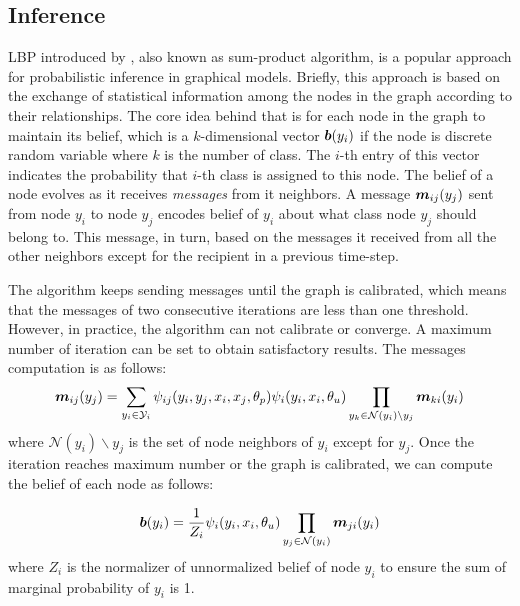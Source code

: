 \subsection{Inference}
\gls{LBP} introduced by \cite{pearl2014probabilistic}, also known as sum-product algorithm, is a popular approach for probabilistic inference in graphical models. Briefly, this approach is based on the exchange of statistical information among the nodes in the graph according to their relationships. The core idea behind that is for each node in the graph to maintain its belief, which is a $k$-dimensional vector $\boldsymbol b(y_i)$ if the node is discrete random variable where $k$ is the number of class. The $i$-th entry of this vector indicates the probability that $i$-th class is assigned to this node. The belief of a node evolves as it receives \textit{messages} from it neighbors. A message $\boldsymbol m_{ij}(y_j)$ sent from node $y_i$ to node $y_j$ encodes belief of $y_i$ about what class node $y_j$ should belong to. This message, in turn, based on the messages it received from all the other neighbors except for the recipient in a previous time-step.

The algorithm keeps sending messages until the graph is calibrated, which means that the messages of two consecutive iterations are less than one threshold. However, in practice, the algorithm can not calibrate or converge. A maximum number of iteration can be set to obtain satisfactory results. The messages computation is as follows:
\begin{equation}
\label{message}
\boldsymbol m_{ij}(y_j) = \sum_{y_i\in \mathcal{Y}_i}\psi_{ij}(y_i, y_j, x_i, x_j, \theta_p)\psi_i(y_i, x_i, \theta_u) \prod_{y_k\in\mathcal{N}(y_i)\backslash y_j}\boldsymbol m_{ki}(y_i)
\end{equation}
where $\mathcal{N}(y_i) \backslash y_j$ is the set of node neighbors of $y_i$ except for $y_j$. Once the iteration reaches maximum number or the graph is calibrated, we can compute the belief of each node as follows:

\begin{equation}
\label{belief}
\boldsymbol b(y_i) = \frac{1}{Z_i}\psi_i(y_i, x_i, \theta_u) \prod_{y_j\in\mathcal{N}(y_i)}\boldsymbol m_{ji}(y_i)
\end{equation}
where $Z_i$ is the normalizer of unnormalized belief of node $y_i$ to ensure the sum of marginal probability of $y_i$ is 1. 


